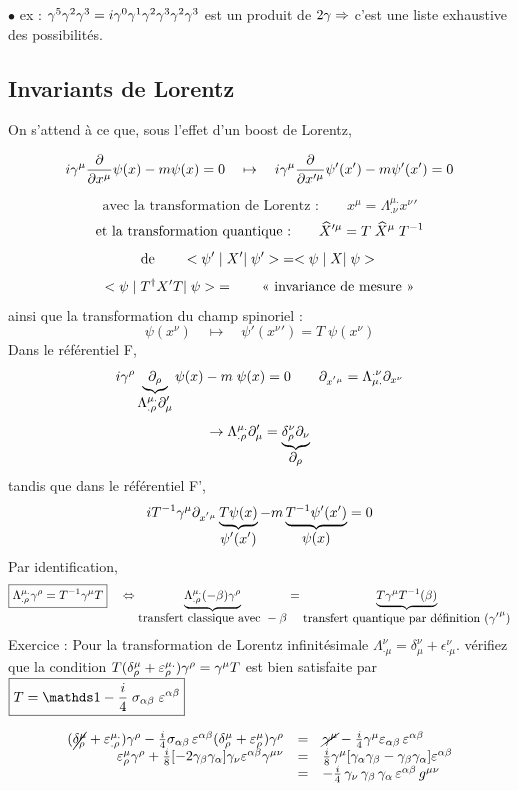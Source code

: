 $\bullet$ ex : $\gamma^5\gamma^2\gamma^3=i\gamma^0\gamma^1\gamma^2\gamma^3\gamma^2\gamma^3$ est un produit de $2\gamma\Rightarrow$
c'est une liste exhaustive des possibilités.

\subsection{Invariants de Lorentz}

On s'attend à ce que, sous l'effet d'un boost de Lorentz,

\[
i\gamma^\mu\frac{\partial}{\partial x^\mu}\psi(x)-m\psi(x)=0\quad\mapsto
\quad i\gamma^\mu\frac{\partial}{\partial x'^\mu}\psi'(x')-m\psi'(x')=0
\]

\[
\text{avec la transformation de Lorentz :}\qquad x^\mu = \Lambda^{\mu.}_{.\nu} x^\nu{'}
\]
\[
\text{et la transformation quantique :}\qquad \widehat{X}'^\mu = T\;\widehat{X}^\mu\;T^{-1}
\]
\[
\text{de}\qquad <{\psi'}\;|\;X'|\;{\psi'}>\;=<{\psi}\;|\;X|\;{\psi}>\;
\]
\[
<{\psi}\;|\;T^\dagger X'T|\;{\psi}>\;= \qquad \text{« invariance de mesure »}
\]
ainsi que la transformation du champ spinoriel :
\[
\psi(x^\nu)\quad\mapsto\quad \psi'(x^\nu{'})=T\;\psi(x^\nu)
\]
Dans le référentiel F,
\[
i\gamma^\rho\underbrace{\partial_\rho}_{\displaystyle {\Lambda^{\mu.}_{.\rho}\partial_\mu'}}\psi(x)-m\;\psi(x)=0
\qquad \partial_{x^{{'}\mu}}=\Lambda^{.\nu}_{\mu.}\partial_{x^\nu}
\]
\[
\rightarrow \Lambda^{\mu.}_{.\rho}\partial_\mu'=\underbrace{\delta^\nu_\rho\partial_\nu}_{\displaystyle {\partial_\rho}}
\]
tandis que dans le référentiel F',
\[
iT^{-1}\gamma^\mu\partial_{x^{{'}\mu}}\underbrace{T\psi(x)}_{\displaystyle {\psi'(x')}}-m\underbrace{T^{-1}\psi'(x')}_{\displaystyle {\psi(x)}}=0
\]
Par identification,
\[
\boxed{\Lambda^{\mu.}_{.\rho}\gamma^\rho=T^{-1}\gamma^\mu T}\quad\Leftrightarrow
\underbrace{\Lambda^{\mu.}_{.\rho}(-\beta)\gamma^\rho}_{\displaystyle {\text{transfert classique avec }-\beta}}=
\underbrace{T\gamma^\mu T^{-1}(\beta)}_{\displaystyle {\text{transfert quantique par définition }(\gamma{'}^{\mu})}}
\]
Exercice :
Pour la transformation de Lorentz infinitésimale $\Lambda_{\cdot\mu}^{\nu} = 
\delta_{\mu}^{\nu} + \epsilon_{\cdot\mu}^{\nu}$.
vérifiez que la condition $T(\delta^\mu_\rho+\varepsilon^{\mu.}_\rho)\gamma^\rho=\gamma^\mu T$ est bien satisfaite par
$\boxed{T=\Id-\frac{i}{4}\;\s_{\a\b}\;\e^{\a\b}}$
\[
\tag{}  \qquad %
\]

\[
\begin{array}{ r c l }
(\cancel{\delta^\mu_\rho}+\varepsilon^{\mu.}_{.\rho})\gamma^\rho-\frac{i}{4}\sigma_{\alpha\beta}\,\varepsilon^{\alpha\beta}(\delta^\mu_\rho+\varepsilon^\mu_\rho)\gamma^\rho
 & = & \cancel{\gamma^\mu}-\frac{i}{4}\gamma^\mu\varepsilon_{\alpha\beta}\,\varepsilon^{\alpha\beta} \\
\varepsilon^\mu_\rho\gamma^\rho+\frac{i}{8}[-2\gamma_\beta\gamma_\alpha]\gamma_\nu\varepsilon^{\alpha\beta}\gamma^{\mu\nu}
 & = & \frac{i}{8}\gamma^\mu[\gamma_\alpha\gamma_\beta-\gamma_\beta\gamma_\alpha]\varepsilon^{\alpha\beta} \\
  & = & -\frac{i}{4}\,\gamma_\nu\,\gamma_\beta\,\gamma_\alpha\,\varepsilon^{\alpha\beta}\,g^{\mu\nu} \\
\end{array}
\]

